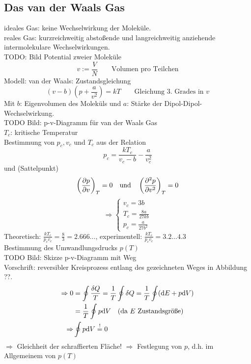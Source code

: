 \subsection{Das van der Waals Gas}
ideales Gas: keine Wechselwirkung der Moleküle.\\
reales Gas: kurzreichweitig abstoßende und langreichweitig anziehende intermolekulare Wechselwirkungen. \\
TODO: Bild Potential zweier Moleküle \\%
\begin{equation}
    v := \frac{V}{N} \qquad \text{Volumen pro Teilchen}
\end{equation}
Modell: van der Waals: Zustandsgleichung
\begin{equation}
    (v-b) \left( p+\frac{a}{v^2} \right) = k T \qquad \text{Gleichung 3. Grades in }v
\end{equation}
Mit $b$: Eigenvolumen des Moleküls und $a$: Stärke der Dipol-Dipol-Wechselwirkung.\\
TODO Bild: p-v-Diagramm für van der Waals Gas \\%
$T_c$: kritische Temperatur \\
Bestimmung von $p_c, v_c$ und $T_c$ aus der Relation
\begin{equation}
    p_c = \frac{k T_c}{v_c - b} - \frac{a}{v_c^2}
\end{equation}
und (Sattelpunkt)
\begin{equation}
    \left( \frac{\partial p}{\partial v} \right)_{T} = 0 \quad \text{und} \quad \left( \frac{\partial^2 p}{\partial v^2} \right)_T = 0
\end{equation}
\begin{equation}
    \Rightarrow
    \begin{cases}
        v_c = 3 b \\
        T_c = \frac{8 a}{27 k b} \\
        p_c = \frac{a}{27 b^2}
    \end{cases}
\end{equation}
Theoretisch: $\frac{k T_c}{p_c v_c} = \frac{8}{3} = 2.666\ldots$, experimentell: $\frac{k T_c}{p_c v_c} = 3.2 \ldots 4.3$ \\
Bestimmung des Umwandlungsdrucks $p(T)$ \\
TODO Bild: Skizze p-v-Diagramm mit Weg \\ %
Vorschrift: reversibler Kreisprozess entlang des gezeichneten Weges in Abbildung ??.  %
\begin{equation}
    \begin{split}
        \Rightarrow  0 &= \oint \frac{\delta Q}{T} = \frac{1}{T} \oint \delta Q = \frac{1}{T} \oint (\mathrm{d} E + p \mathrm{d} V) \\
        &= \frac{1}{T} \oint p \mathrm{d} V \quad \text{(da $E$ Zustandsgröße)} \\
        \Rightarrow & \oint p \mathrm{d} V \overset{!}{=} 0
    \end{split}
\end{equation}
$\Rightarrow$ Gleichheit der schraffierten Fläche! $\Rightarrow$ Festlegung von $p$, d.h. im Allgemeinem von $p(T)$

